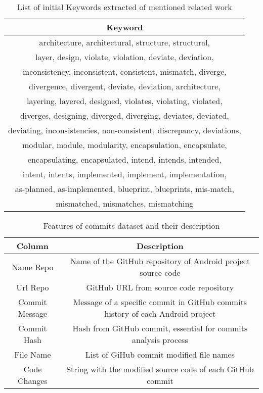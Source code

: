\begin{table}[H]
    \centering
    \begin{tabular}{|c|}
        \hline
        Keyword \\
        \hline
         architecture, architectural, structure, structural, \\
         layer, design, violate, violation, deviate, deviation,\\
         inconsistency, inconsistent, consistent, mismatch, diverge,\\
         divergence, divergent, deviate, deviation, architecture,\\
         layering, layered, designed, violates, violating, violated,\\
         diverges, designing, diverged, diverging, deviates, deviated, \\
         deviating, inconsistencies, non-consistent, discrepancy, deviations, \\
         modular, module, modularity, encapsulation, encapsulate, \\
         encapsulating, encapsulated, intend, intends, intended, \\
         intent, intents, implemented, implement, implementation,\\
         as-planned, as-implemented, blueprint, blueprints, mis-match,\\
         mismatched, mismatches, mismatching\\
         \hline
    \end{tabular}
    \caption{List of initial Keywords extracted of mentioned related work}
    \label{tab:my_label}
\end{table}

\begin{table}[H]
    \centering
    \begin{tabular}{|c|c|}
        \hline
        Column & Description \\
        \hline
        Name Repo & Name of the GitHub repository of Android project source code \\
        \hline
        Url Repo & GitHub URL from source code repository \\
        \hline
       Commit Message & Message of a specific commit in GitHub commits history of each Android project \\
       \hline
       Commit Hash & Hash from GitHub commit, essential for commits analysis process \\
       \hline
       File Name & List of GiHub commit modified file names \\
       \hline
       Code Changes & String with the modified source code of each GitHub commit \\
       \hline
    \end{tabular}
    \caption{Features of commits dataset and their description}
    \label{tab:my_label}
\end{table}

